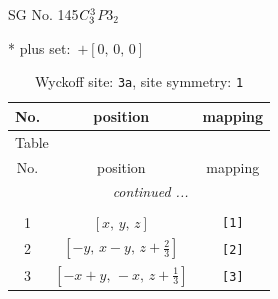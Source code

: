 \documentclass[fleqn,8pt]{jsarticle}
\begin{document}
\setcounter{MaxMatrixCols}{32}

\renewcommand{\tablename}{Table~}
\renewcommand{\figurename}{Figure~}
\begin{center}
\LARGE
SG No. 145\quad$C_{\rm 3}^{3}$\quad$P3_2$\quad[ trigonal ]
\end{center}
* plus set:\,\,\,$+\left[ 0,\, 0,\, 0 \right]$
\renewcommand{\arraystretch}{1.2}
\begin{longtable}{ccc}
\caption{Wyckoff site: {\tt 3a}, site symmetry: {\tt 1}}
 \\
 \hline \hline
No. & position & mapping \\ \hline \endfirsthead

\multicolumn{2}{l}{\tablename\ \thetable{}} \\
 \hline \hline
No. & position & mapping \\ \hline \endhead

 \hline \hline
\multicolumn{2}{r}{\footnotesize\it continued ...} \\ \endfoot

 \hline \hline
\multicolumn{2}{r}{} \\ \endlastfoot

1 & $\left[ x,\, y,\, z \right]$ & {\tt [1]} \\ \hline
2 & $\left[ - y,\, x - y,\, z + \frac{2}{3} \right]$ & {\tt [2]} \\ \hline
3 & $\left[ - x + y,\, - x,\, z + \frac{1}{3} \right]$ & {\tt [3]} \\
\end{longtable}
\end{document}
